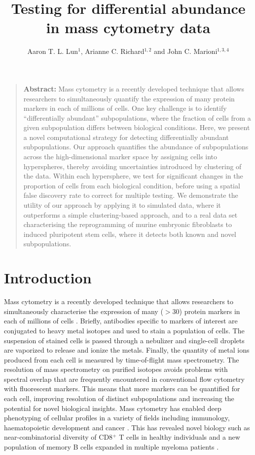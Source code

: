 \documentclass{article}
\title{Testing for differential abundance in mass cytometry data}
\author{Aaron T. L. Lun$^{1}$, Arianne C. Richard$^{1,2}$ and John C. Marioni$^{1,3,4}$}
\date{
\begin{minipage}{0.9\textwidth}
\begin{flushleft} 
\begin{small}
$^1$Cancer Research UK Cambridge Institute, University of Cambridge, Li Ka Shing Centre, Robinson Way, Cambridge CB2 0RE, United Kingdom \\
$^2$Cambridge Institute for Medical Research,  University of Cambridge, Wellcome Trust/MRC Building, Hills Road, Cambridge CB2 0XY, United Kingdom \\
$^3$EMBL European Bioinformatics Institute, Wellcome Genome Campus, Hinxton, Cambridge CB10 1SD, United Kingdom \\
$^4$Wellcome Trust Sanger Institute, Wellcome Genome Campus, Hinxton, Cambridge CB10 1SA, United Kingdom \\
\end{small}
\end{flushleft}
\end{minipage}\\[0.2in]
\today{}
}
\begin{document}
\maketitle

\begin{quote}
\textbf{Abstract:} Mass cytometry is a recently developed technique that allows researchers to simultaneously quantify the expression of many protein markers in each of millions of cells. 
One key challenge is to identify ``differentially abundant'' subpopulations, where the fraction of cells from a given subpopulation differs between biological conditions. 
Here, we present a novel computational strategy for detecting differentially abundant subpopulations.
Our approach quantifies the abundance of subpopulations across the high-dimensional marker space by assigning cells into hyperspheres, thereby avoiding uncertainties introduced by clustering of the data. 
Within each hypersphere, we test for significant changes in the proportion of cells from each biological condition, before using a spatial false discovery rate to correct for multiple testing.
We demonstrate the utility of our approach by applying it to simulated data, where it outperforms a simple clustering-based approach, and to a real data set characterising the reprogramming of murine embryonic fibroblasts to induced pluripotent stem cells, where it detects both known and novel subpopulations.
\end{quote}

\section{Introduction}
Mass cytometry is a recently developed technique that allows researchers to simultaneously characterise the expression of many ($>30$) protein markers in each of millions of cells \cite{ornatsky2008study}.
Briefly, antibodies specific to markers of interest are conjugated to heavy metal isotopes and used to stain a population of cells.
The suspension of stained cells is passed through a nebulizer and single-cell droplets are vaporized to release and ionize the metals.
Finally, the quantity of metal ions produced from each cell is measured by time-of-flight mass spectrometry.
The resolution of mass spectrometry on purified isotopes avoids problems with spectral overlap that are frequently encountered in conventional flow cytometry with fluorescent markers.
This means that more markers can be quantified for each cell, improving resolution of distinct subpopulations and increasing the potential for novel biological insights.
Mass cytometry has enabled deep phenotyping of cellular profiles in a variety of fields including immunology, haematopoietic development and cancer \cite{leipold2015multiparameter,leelatian2015characterizing,hansmann2015mass,bendall2011singlecell,newell2012cytometry,levine2015datadriven}.
This has revealed novel biology such as near-combinatorial diversity of CD8$^+$ T cells in healthy individuals \cite{newell2012cytometry} and a new population of memory B cells expanded in multiple myeloma patients \cite{hansmann2015mass}.
\end{document}
